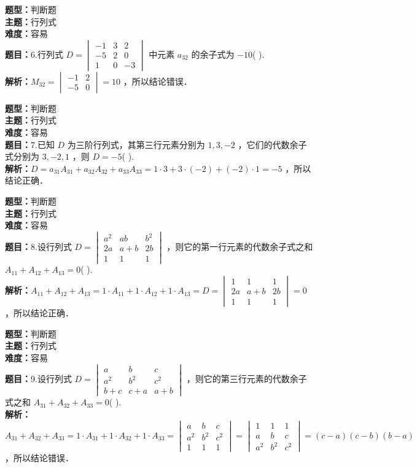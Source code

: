 \documentclass{ctexart}
\newenvironment{question}[5]{%
	\noindent\textbf{题型：}#1\\
	\textbf{主题：}#2\\
	\textbf{难度：}#3\\
	\textbf{题目：}#4\\
	\textbf{解析：}#5\\
	\vspace{1em}
}{}
\begin{document}
	\begin{question}
		{判断题}
		{行列式}
		{容易}
		{6.行列式 $D=\begin{vmatrix}-1 & 3 & 2 \\ -5 & 2 & 0 \\ 1 & 0 & -3\end{vmatrix}$ 中元素 $a_{32}$ 的余子式为 $-10$(  ).}
		{$M_{32}=\begin{vmatrix}-1 & 2 \\ -5 & 0\end{vmatrix}=10$ ，所以结论错误．}
	\end{question}
	
	\begin{question}
		{判断题}
		{行列式}
		{容易}
		{7.已知 $D$ 为三阶行列式，其第三行元素分别为 $1,3,-2$ ，它们的代数余子式分别为 $3,-2,1$ ，则 $D=-5$(  ).}
		{$D=a_{31} A_{31}+a_{32} A_{32}+a_{33} A_{33}=1 \cdot 3 + 3 \cdot (-2) + (-2) \cdot 1 = -5$ ，所以结论正确．}
	\end{question}
	
	\begin{question}
		{判断题}
		{行列式}
		{容易}
		{8.设行列式 $D=\begin{vmatrix}a^2 & ab & b^2 \\ 2a & a+b & 2b \\ 1 & 1 & 1\end{vmatrix}$ ，则它的第一行元素的代数余子式之和 $A_{11}+A_{12}+A_{13}=0$(  ).}
		{$A_{11}+A_{12}+A_{13}=1 \cdot A_{11} + 1 \cdot A_{12} + 1 \cdot A_{13} = D = \begin{vmatrix}1 & 1 & 1 \\ 2a & a+b & 2b \\ 1 & 1 & 1\end{vmatrix}=0$ ，所以结论正确．}
	\end{question}
	
	\begin{question}
		{判断题}
		{行列式}
		{容易}
		{9.设行列式 $D=\begin{vmatrix}a & b & c \\ a^2 & b^2 & c^2 \\ b+c & c+a & a+b\end{vmatrix}$ ，则它的第三行元素的代数余子式之和 $A_{31}+A_{32}+A_{33}=0$(  ).}
		{$A_{31}+A_{32}+A_{33}=1 \cdot A_{31}+1 \cdot A_{32}+1 \cdot A_{33} = \begin{vmatrix}a & b & c \\ a^2 & b^2 & c^2 \\ 1 & 1 & 1\end{vmatrix}=\begin{vmatrix}1 & 1 & 1 \\ a & b & c \\ a^2 & b^2 & c^2\end{vmatrix}=(c-a)(c-b)(b-a)$ ，所以结论错误．}
	\end{question}
	
\end{document}

